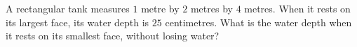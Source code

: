 A rectangular tank measures $ 1 $ metre by $ 2 $ metres by $ 4 $ metres. When it rests on its largest face, its water depth is $ 25 $ centimetres. What is the water depth when it rests on its smallest face, without losing water?
